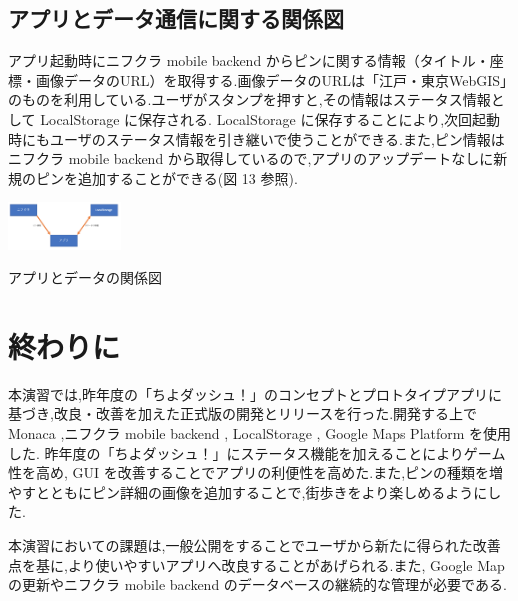 \documentclass[a4paper, twoside]{jarticle}
\makeatletter
\newenvironment{figurehere}
  {\def\@captype{figure}}
  {}
\makeatother
\begin{document}
\begin{multicols}{2}
\subsection{アプリとデータ通信に関する関係図}
アプリ起動時にニフクラ mobile backend からピンに関する情報（タイトル・座標・画像データのURL）を取得する.画像データのURLは「江戸・東京WebGIS」のものを利用している.ユーザがスタンプを押すと,その情報はステータス情報として LocalStorage に保存される. LocalStorage に保存することにより,次回起動時にもユーザのステータス情報を引き継いで使うことができる.また,ピン情報はニフクラ mobile backend から取得しているので,アプリのアップデートなしに新規のピンを追加することができる(図 13 参照).
\begin{figurehere}
\begin{center}
\includegraphics[bb=30 100 550 500,width=3cm]{./image12.png}%
\end{center}
\caption{アプリとデータの関係図}\label{fig:13}
\end{figurehere}


\section{終わりに}
本演習では,昨年度の「ちよダッシュ！」のコンセプトとプロトタイプアプリに基づき,改良・改善を加えた正式版の開発とリリースを行った.開発する上で Monaca ,ニフクラ mobile backend , LocalStorage , Google Maps Platform を使用した.
昨年度の「ちよダッシュ！」にステータス機能を加えることによりゲーム性を高め, GUI を改善することでアプリの利便性を高めた.また,ピンの種類を増やすとともにピン詳細の画像を追加することで,街歩きをより楽しめるようにした.\par
本演習においての課題は,一般公開をすることでユーザから新たに得られた改善点を基に,より使いやすいアプリへ改良することがあげられる.また, Google Map の更新やニフクラ mobile backend のデータベースの継続的な管理が必要である.



\end{multicols} %
\vspace{1cm}
\end{document}
